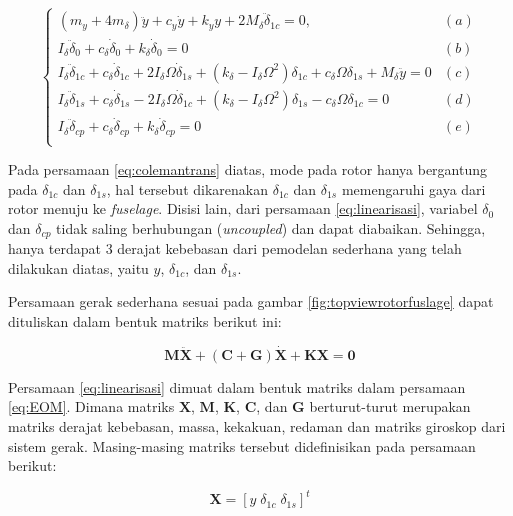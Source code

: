 \begin{equation}
	\begin{cases}
	(m_y+4m_{\delta})\ddot{y}+c_y\dot{y}+k_yy+2M_{\delta}\ddot{\delta}_{1c}=0, &(a)\\
	I_{\delta}\ddot{\delta}_0+c_{\delta}\dot{\delta}_0+k_{\delta}\dot{\delta}_0=0&(b)\\
	I_{\delta}\ddot{\delta}_{1c}+c_{\delta}\dot{\delta}_{1c}+2I_{\delta}\Omega\dot{\delta}_{1s}+(k_{\delta}-I_{\delta}\Omega^2)\delta_{1c}+c_{\delta}\Omega\delta_{1s}+M_{\delta}\ddot{y}=0&(c)\\	I_{\delta}\ddot{\delta}_{1s}+c_{\delta}\dot{\delta}_{1s}-2I_{\delta}\Omega\dot{\delta}_{1c}+(k_{\delta}-I_{\delta}\Omega^2)\delta_{1s}-c_{\delta}\Omega\delta_{1c}=0&(d)\\
	I_{\delta}\ddot{\delta}_{cp}+c_{\delta}\dot{\delta}_{cp}+k_{\delta}\dot{\delta}_{cp}=0&(e)\\
	\end{cases}
	\label{eq:linearisasi}
\end{equation}

Pada persamaan \ref{eq:colemantrans} diatas, mode pada rotor hanya bergantung pada $\delta_{1c}$ dan $\delta_{1s}$, hal tersebut dikarenakan $\delta_{1c}$ dan $\delta_{1s}$ memengaruhi gaya dari rotor menuju ke \textit{fuselage}. Disisi lain, dari persamaan \ref{eq:linearisasi}, variabel $\delta_0$ dan $\delta_{cp}$ tidak saling berhubungan (\textit{uncoupled}) dan dapat diabaikan. Sehingga, hanya terdapat 3 derajat kebebasan dari pemodelan sederhana yang telah dilakukan diatas, yaitu $y$, $\delta_{1c}$, dan $\delta_{1s}$.

Persamaan gerak sederhana sesuai pada gambar \ref{fig:topviewrotorfuslage} dapat dituliskan dalam bentuk matriks berikut ini:

\begin{equation}
	\label{eq:EOM}
	\mathbf{M\ddot{X}}+(\mathbf{C}+\mathbf{G})\mathbf{\dot{X}}+\mathbf{KX}=\mathbf{0}
\end{equation}

Persamaan \ref{eq:linearisasi} dimuat dalam bentuk matriks dalam persamaan \ref{eq:EOM}. Dimana matriks $\mathbf{X}$, $\mathbf{M}$, $\mathbf{K}$, $\mathbf{C}$, dan $\mathbf{G}$ berturut-turut merupakan matriks derajat kebebasan, massa, kekakuan, redaman dan matriks giroskop dari sistem gerak. Masing-masing matriks tersebut didefinisikan pada persamaan berikut:

\begin{equation}
	\label{eq:DOF}
	\mathbf{X}=[y \; \delta_{1c} \; \delta_{1s}]^t
\end{equation}

